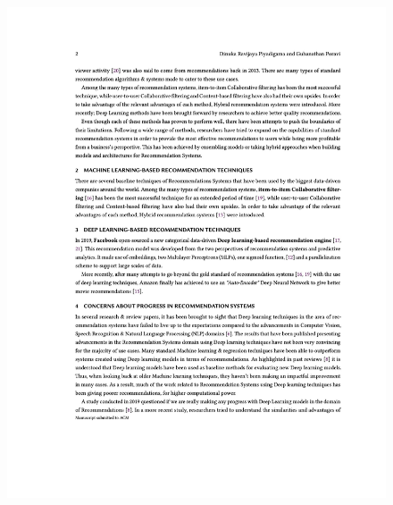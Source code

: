 \begin{figure}[h!]
\centering
\includegraphics[width=\textwidth]{images/appendix/papers/review/A Review on Pushing the Limits of Baseline Recommendation Systems with the integration of Opinion Mining & Information Retrieval Techniques 2.jpeg}
\end{figure}

